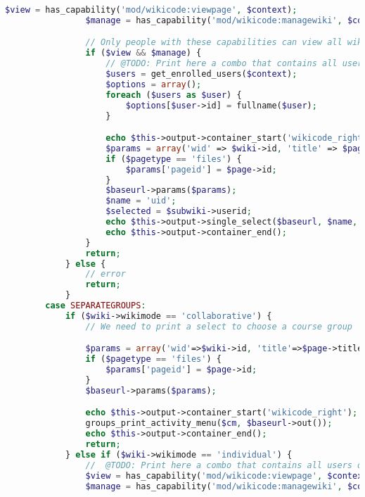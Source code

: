 \begin{lstlisting}[language=PHP]
                $view = has_capability('mod/wikicode:viewpage', $context);
                $manage = has_capability('mod/wikicode:managewiki', $context);

                // Only people with these capabilities can view all wikis
                if ($view && $manage) {
                    // @TODO: Print here a combo that contains all users.
                    $users = get_enrolled_users($context);
                    $options = array();
                    foreach ($users as $user) {
                        $options[$user->id] = fullname($user);
                    }

                    echo $this->output->container_start('wikicode_right');
                    $params = array('wid' => $wiki->id, 'title' => $page->title);
                    if ($pagetype == 'files') {
                        $params['pageid'] = $page->id;
                    }
                    $baseurl->params($params);
                    $name = 'uid';
                    $selected = $subwiki->userid;
                    echo $this->output->single_select($baseurl, $name, $options, $selected);
                    echo $this->output->container_end();
                }
                return;
            } else {
                // error
                return;
            }
        case SEPARATEGROUPS:
            if ($wiki->wikimode == 'collaborative') {
                // We need to print a select to choose a course group

                $params = array('wid'=>$wiki->id, 'title'=>$page->title);
                if ($pagetype == 'files') {
                    $params['pageid'] = $page->id;
                }
                $baseurl->params($params);

                echo $this->output->container_start('wikicode_right');
                groups_print_activity_menu($cm, $baseurl->out());
                echo $this->output->container_end();
                return;
            } else if ($wiki->wikimode == 'individual') {
                //  @TODO: Print here a combo that contains all users of that subwiki.
                $view = has_capability('mod/wikicode:viewpage', $context);
                $manage = has_capability('mod/wikicode:managewiki', $context);


\end{lstlisting}
